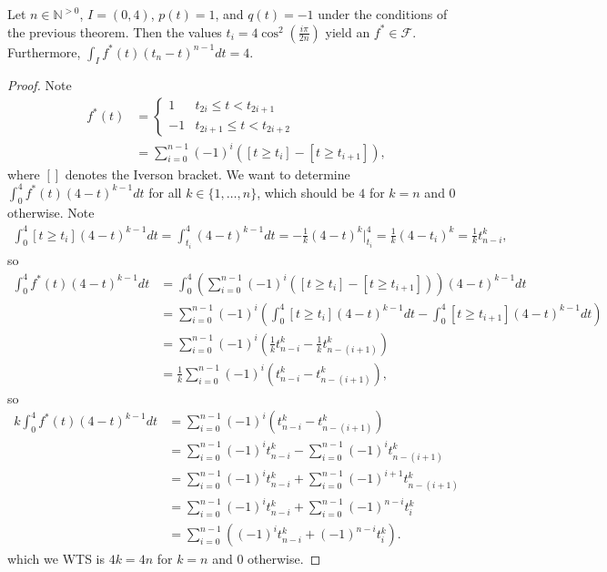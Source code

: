 \documentclass{article}
\begin{document}
\newpage
\begin{lemma}
  Let $n \in \mathbb{N}^{>0}$, $I = (0, 4)$,
  $p(t) = 1$, and $q(t) = -1$
  under the conditions of the previous theorem.
  Then the values $t_i = 4\cos^2\left(\frac{i\pi}{2n}\right)$
  yield an $f^* \in \mathcal{F}$.
  Furthermore, $\int_I f^*(t)(t_n-t)^{n-1} dt = 4$.
\end{lemma}
\begin{proof}
  Note
  \begin{align*}
    f^*(t) &= 
    \begin{cases}
      1 & t_{2i} \leq t < t_{2i+1} \\
      -1 & t_{2i+1} \leq t < t_{2i+2}
    \end{cases} \\
    &= \sum_{i=0}^{n-1}(-1)^i\left([t \geq t_i]-[t \geq t_{i+1}]\right),
  \end{align*}
  where $[]$ denotes the Iverson bracket.
  We want to determine
  $\int_0^4f^*(t)(4-t)^{k-1}dt$
  for all $k \in \{1, \ldots, n\}$,
  which should be $4$ for $k = n$ and $0$ otherwise.
  Note
  \begin{align*}
    \int_0^4[t \geq t_i](4-t)^{k-1} dt = \int_{t_i}^4 (4-t)^{k-1} dt
    = -\frac{1}{k}(4-t)^k\Bigg|_{t_i}^4
    = \frac{1}{k}(4-t_i)^k
    = \frac{1}{k}t_{n-i}^k,
  \end{align*}
  so
  \begin{align*}
    \int_0^4f^*(t)(4-t)^{k-1}dt
    &= \int_0^4\left(\sum_{i=0}^{n-1}(-1)^i\left([t \geq t_i]-[t \geq t_{i+1}]\right)\right) (4-t)^{k-1}dt \\
    &= \sum_{i=0}^{n-1}(-1)^i\left(\int_0^4[t \geq t_i] (4-t)^{k-1}dt-\int_0^4[t \geq t_{i+1}] (4-t)^{k-1}dt\right) \\
    &= \sum_{i=0}^{n-1}(-1)^i\left(\frac{1}{k}t_{n-i}^k-\frac{1}{k}t_{n-(i+1)}^k\right) \\
    &= \frac{1}{k}\sum_{i=0}^{n-1}(-1)^i\left(t_{n-i}^k-t_{n-(i+1)}^k\right),
  \end{align*}
  so
  \begin{align*}
    k\int_0^4f^*(t)(4-t)^{k-1}dt
    &= \sum_{i=0}^{n-1}(-1)^i\left(t_{n-i}^k-t_{n-(i+1)}^k\right) \\
    &= \sum_{i=0}^{n-1}(-1)^it_{n-i}^k-\sum_{i=0}^{n-1}(-1)^it_{n-(i+1)}^k \\
    &= \sum_{i=0}^{n-1}(-1)^it_{n-i}^k+\sum_{i=0}^{n-1}(-1)^{i+1}t_{n-(i+1)}^k \\
    &= \sum_{i=0}^{n-1}(-1)^it_{n-i}^k+\sum_{i=0}^{n-1}(-1)^{n-i}t_i^k \\
    &= \sum_{i=0}^{n-1}((-1)^it_{n-i}^k+(-1)^{n-i}t_i^k).
  \end{align*}
  which we WTS is $4k=4n$ for $k = n$ and $0$ otherwise.
  

\end{proof}
\end{document}
